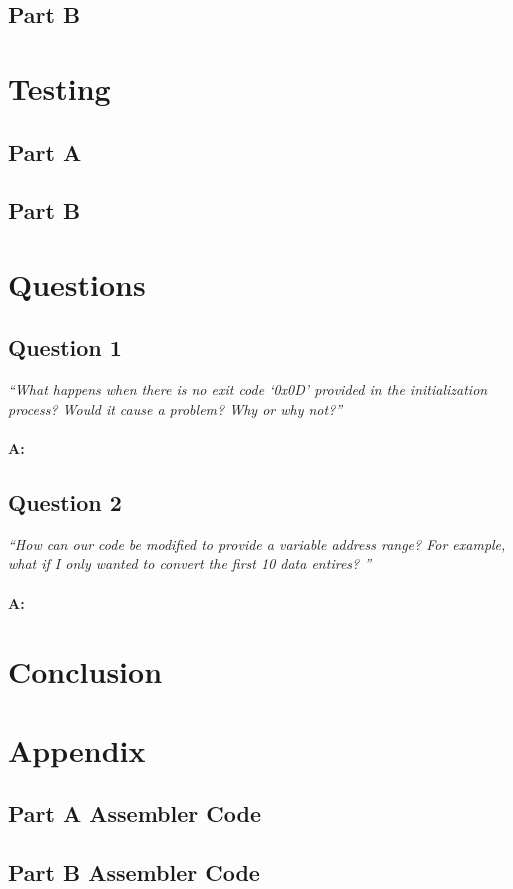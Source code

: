 \documentclass[letterpaper]{article}
\newenvironment{changemargin}[2]{%
\begin{list}{}{%
\setlength{\topsep}{0pt}%
\setlength{\leftmargin}{#1}%
\setlength{\rightmargin}{#2}%
\setlength{\listparindent}{\parindent}%
\setlength{\itemindent}{\parindent}%
\setlength{\parsep}{\parskip}%
}%
\item[]}{\end{list}}
\begin{document}
  \subsection{Part B}
    \lipsum[4]

\section{Testing}
  \subsection{Part A}
    \lipsum[5]

  \subsection{Part B}
    \lipsum[6]

\section{Questions}

    \subsection{Question 1}
      \textit{``What happens when there is no exit code ‘0x0D’ provided in the initialization process? Would it cause a problem? Why or why not?''}
      \\ \\
      \noindent\textbf{A:}
      \lipsum[7]

    \subsection{Question 2}
      \textit{``How can our code be modified to provide a variable address range? For example, what if I only wanted to convert the first 10 data entires? ''}
      \\ \\
      \noindent\textbf{A:}
      \lipsum[8]

\section{Conclusion}
  \lipsum[9]
  \medskip
  \lipsum[10]

\newpage
\section{Appendix}
  \subsection{Part A Assembler Code}
    \begin{changemargin}{-2cm}{-2cm}
    
  \end{changemargin}
\newpage

  \subsection{Part B Assembler Code}
    
\end{document}
